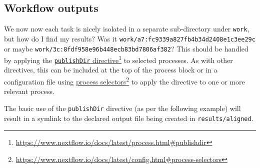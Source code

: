%
%
%
%
%
%


\subsection{Workflow outputs}

We now now each task is nicely isolated in a separate sub-directory under \texttt{work}, but how do I find my results? Was it \texttt{work/a7:fc9339a827fb4b34d2408e1c3ee29c} or maybe \texttt{work/3c:8fdf958e96b448ecb83bd7806af382}? This should be handled by applying the \href{https://www.nextflow.io/docs/latest/process.html#publishdir}{\texttt{publishDir} directive}\footnote{\url{https://www.nextflow.io/docs/latest/process.html\#publishdir}} to selected processes. As with other directives, this can be included at the top of the process block or in a configuration file using \href{https://www.nextflow.io/docs/latest/config.html#process-selectors}{process selectors}\footnote{\url{https://www.nextflow.io/docs/latest/config.html\#process-selectors}} to apply the directive to one or more relevant process. 

The basic use of the \texttt{publishDir} directive (as per the following example) will result in a symlink to the declared output file being created in \texttt{results/aligned}.


